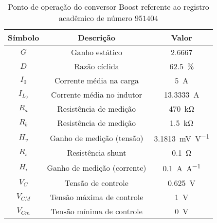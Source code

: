 \begin{table}[!ht]
\centering
\caption{Ponto de operação do conversor Boost referente ao registro acadêmico de número $951404$}
\label{tab:steadystate}
\begin{tabular}{@{}ccc@{}}
\toprule
\textbf{Símbolo} & \textbf{Descrição} & \textbf{Valor}\\ \midrule
$G$ & Ganho estático & \SI{2.6667}{}\\
$D$ & Razão cíclida  & \SI{62.5}{\%}\\
$I_0$ & Corrente média na carga  & \SI{5}{\A} \\
$I_{L_0}$ & Corrente média no indutor & \SI{13.3333}{\A} \\
$R_a$ & Resistência de medição & \SI{470}{\kilo\ohm} \\
$R_b$ & Resistência de medição & \SI{1.5}{\kilo\ohm} \\
$H_v$ & Ganho de medição (tensão) & \SI{3.1813}{\milli\V\per\V} \\
$R_s$ & Resistência shunt & \SI{0.1}{\ohm} \\
$H_i$ & Ganho de medição (corrente) & \SI{0.1}{\A\per\A} \\
$V_C$ & Tensão de controle  & \SI{0.625}{\V} \\
$V_{CM}$ & Tensão máxima de controle  & \SI{1}{\V} \\
$V_{Cm}$ & Tensão mínima de controle  & \SI{0}{\V} \\
\bottomrule
\end{tabular}
\end{table}

